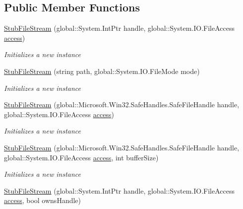 \subsection*{Public Member Functions}
\begin{DoxyCompactItemize}
\item 
\hyperlink{class_system_1_1_i_o_1_1_fakes_1_1_stub_file_stream_a6bc6b175b906057c8d6ada887916b4a2}{Stub\-File\-Stream} (global\-::\-System.\-Int\-Ptr handle, global\-::\-System.\-I\-O.\-File\-Access \hyperlink{jquery-1_810_82-vsdoc_8js_a130ad18d21e14ee566dbf4eb185f2bda}{access})
\begin{DoxyCompactList}\small\item\em Initializes a new instance\end{DoxyCompactList}\item 
\hyperlink{class_system_1_1_i_o_1_1_fakes_1_1_stub_file_stream_a7b427de49a28fbc40aa5de13e21b0cd6}{Stub\-File\-Stream} (string path, global\-::\-System.\-I\-O.\-File\-Mode mode)
\begin{DoxyCompactList}\small\item\em Initializes a new instance\end{DoxyCompactList}\item 
\hyperlink{class_system_1_1_i_o_1_1_fakes_1_1_stub_file_stream_ae4f4d118cdfeb046a2346d1030143751}{Stub\-File\-Stream} (global\-::\-Microsoft.\-Win32.\-Safe\-Handles.\-Safe\-File\-Handle handle, global\-::\-System.\-I\-O.\-File\-Access \hyperlink{jquery-1_810_82-vsdoc_8js_a130ad18d21e14ee566dbf4eb185f2bda}{access})
\begin{DoxyCompactList}\small\item\em Initializes a new instance\end{DoxyCompactList}\item 
\hyperlink{class_system_1_1_i_o_1_1_fakes_1_1_stub_file_stream_a0582282e33815645510bd300153d6992}{Stub\-File\-Stream} (global\-::\-Microsoft.\-Win32.\-Safe\-Handles.\-Safe\-File\-Handle handle, global\-::\-System.\-I\-O.\-File\-Access \hyperlink{jquery-1_810_82-vsdoc_8js_a130ad18d21e14ee566dbf4eb185f2bda}{access}, int buffer\-Size)
\begin{DoxyCompactList}\small\item\em Initializes a new instance\end{DoxyCompactList}\item 
\hyperlink{class_system_1_1_i_o_1_1_fakes_1_1_stub_file_stream_ad38cd7924985c1ba0eabeb44c632f4a6}{Stub\-File\-Stream} (global\-::\-System.\-Int\-Ptr handle, global\-::\-System.\-I\-O.\-File\-Access \hyperlink{jquery-1_810_82-vsdoc_8js_a130ad18d21e14ee566dbf4eb185f2bda}{access}, bool owns\-Handle)

\end{DoxyCompactItemize}
